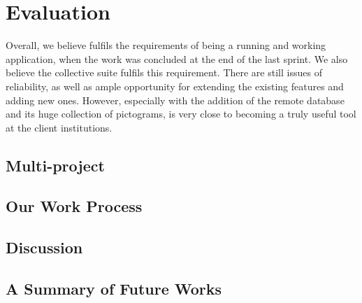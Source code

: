 \chapter{Evaluation}\label{chap:evaluation}

Overall, we believe \launcher fulfils the requirements of being a running and working application, when the work was concluded at the end of the last sprint.
We also believe the collective \giraf suite fulfils this requirement.
There are still issues of reliability, as well as ample opportunity for extending the existing features and adding new ones.
However, especially with the addition of the remote database and its huge collection of pictograms, \giraf is very close to becoming a truly useful tool at the client institutions. 

\section{Multi-project}\label{sec:eval:multiproject}


\section{Our Work Process}\label{sec:eval:us}


\section{Discussion}\label{sec:eval:discussion}


\section{A Summary of Future Works}
